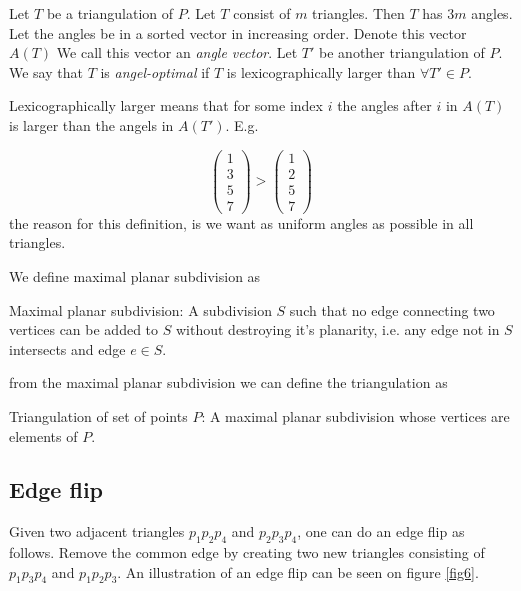 \documentclass[10pt]{article}
\begin{document}
Let $T$ be a triangulation of $P$. Let $T$ consist of $m$ triangles. Then $T$ has $3m$ angles. Let the angles be in a sorted vector in increasing order. Denote this vector $A(T)$ We call this vector an \emph{angle vector}. Let $T'$ be another triangulation of $P$. We say that $T$ is \emph{angel-optimal} if $T$ is lexicographically larger than $\forall T'\in P$.

Lexicographically larger means that for some index $i$ the angles after $i$ in $A(T)$ is larger than the angels in $A(T')$. E.g.

\begin{equation} 
\left(
\begin{array}{r} 
   1  \\
   3 \\
   5 \\
   7 
\end{array} 
\right) >   
\left(
\begin{array}{r} 
   1  \\
   2 \\
   5 \\
   7 
\end{array} 
\right)
\end{equation} 
the reason for this definition, is we want as uniform angles as possible in all triangles.


We define maximal planar subdivision as
\begin{definition}
Maximal planar subdivision: A subdivision $S$ such that no edge connecting two vertices can be added to $S$ without destroying it's planarity, i.e. any edge not in $S$ intersects and edge $e \in S$.  
\end{definition}
from the maximal planar subdivision we can define the triangulation as
\begin{definition}
Triangulation of set of points $P$: A maximal planar subdivision whose vertices are elements of $P$.  
\end{definition}




\subsection{Edge flip} %
\label{sub:edge_flip}
Given two adjacent triangles $p_1 p_2 p_4$ and $p_2 p_3 p_4$, one can do an edge flip as follows. Remove the common edge by creating two new triangles consisting of $p_1 p_3 p_4$ and $p_1 p_2 p_3$. An illustration of an edge flip can be seen on figure \ref{fig6}.
\end{document}
